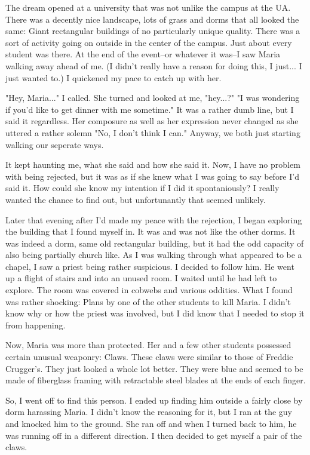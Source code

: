 The dream opened at a university that was not unlike the campus at the UA.  There was a decently nice landscape, lots of grass and dorms that all looked the same:  Giant rectangular buildings of no particularly unique quality.  There was a sort of activity going on outside in the center of the campus.  Just about every student was there.  At the end of the event--or whatever it was--I saw Maria walking away ahead of me. (I didn't really have a reason for doing this, I just... I just wanted to.) I quickened my pace to catch up with her.

  "Hey, Maria..." I called.
She turned and looked at me, "hey...?"
  "I was wondering if you'd like to get dinner with me sometime."
It was a rather dumb line, but I said it regardless.  Her composure as well as her expression never changed as she uttered a rather solemn "No, I don't think I can."
Anyway, we both just starting walking our seperate ways.

It kept haunting me, what she said and how she said it.  Now, I have no problem with being rejected, but it was as if she knew what I was going to say before I'd said it.  How could she know my intention if I did it spontaniously?  I really wanted the chance to find out, but unfortunantly that seemed unlikely.

Later that evening after I'd made my peace with the rejection, I began exploring the building that I found myself in.  It was and was not like the other dorms.  It was indeed a dorm, same old rectangular building, but it had the odd capacity of also being partially church like.  As I was walking through what appeared to be a chapel, I saw a priest being rather suspicious.  I decided to follow him.  He went up a flight of stairs and into an unused room.  I waited until he had left to explore.  The room was covered in cobwebs and various oddities.  What I found was rather shocking:  Plans by one of the other students to kill Maria.  I didn't know why or how the priest was involved, but I did know that I needed to stop it from happening.

Now, Maria was more than protected.  Her and a few other students possessed certain unusual weaponry:  Claws.  These claws were similar to those of Freddie Crugger's.  They just looked a whole lot better.  They were blue and seemed to be made of fiberglass framing with retractable steel blades at the ends of each finger.

So, I went off to find this person.  I ended up finding him outside a fairly close by dorm harassing Maria.  I didn't know the reasoning for it, but I ran at the guy and knocked him to the ground. She ran off and when I turned back to him, he was running off in a different direction.  I then decided to get myself a pair of the claws.

